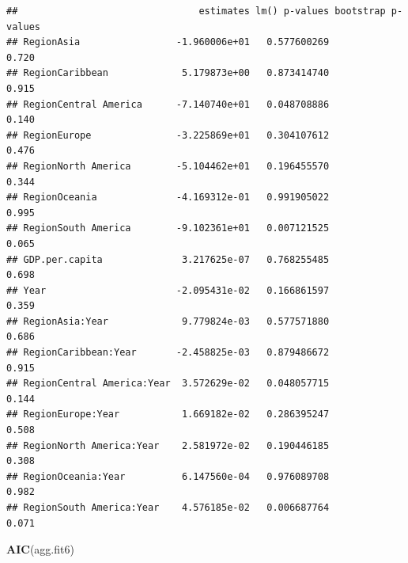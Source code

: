 \documentclass[11pt,]{article}
\newenvironment{Shaded}{\begin{snugshade}}{\end{snugshade}}
\newcommand{\CommentTok}[1]{\textcolor[rgb]{0.56,0.35,0.01}{\textit{#1}}}
\newcommand{\DecValTok}[1]{\textcolor[rgb]{0.00,0.00,0.81}{#1}}
\newcommand{\KeywordTok}[1]{\textcolor[rgb]{0.13,0.29,0.53}{\textbf{#1}}}
\newcommand{\NormalTok}[1]{#1}
\newcommand{\OperatorTok}[1]{\textcolor[rgb]{0.81,0.36,0.00}{\textbf{#1}}}
\newcommand{\StringTok}[1]{\textcolor[rgb]{0.31,0.60,0.02}{#1}}
\begin{document}
\begin{Shaded}
\end{Shaded}

\begin{verbatim}
##                                estimates lm() p-values bootstrap p-values
## RegionAsia                 -1.960006e+01   0.577600269              0.720
## RegionCaribbean             5.179873e+00   0.873414740              0.915
## RegionCentral America      -7.140740e+01   0.048708886              0.140
## RegionEurope               -3.225869e+01   0.304107612              0.476
## RegionNorth America        -5.104462e+01   0.196455570              0.344
## RegionOceania              -4.169312e-01   0.991905022              0.995
## RegionSouth America        -9.102361e+01   0.007121525              0.065
## GDP.per.capita              3.217625e-07   0.768255485              0.698
## Year                       -2.095431e-02   0.166861597              0.359
## RegionAsia:Year             9.779824e-03   0.577571880              0.686
## RegionCaribbean:Year       -2.458825e-03   0.879486672              0.915
## RegionCentral America:Year  3.572629e-02   0.048057715              0.144
## RegionEurope:Year           1.669182e-02   0.286395247              0.508
## RegionNorth America:Year    2.581972e-02   0.190446185              0.308
## RegionOceania:Year          6.147560e-04   0.976089708              0.982
## RegionSouth America:Year    4.576185e-02   0.006687764              0.071
\end{verbatim}

\begin{Shaded}
\begin{Highlighting}[]
\KeywordTok{AIC}\NormalTok{(agg.fit6)}
\end{Highlighting}
\end{Shaded}
\end{document}
